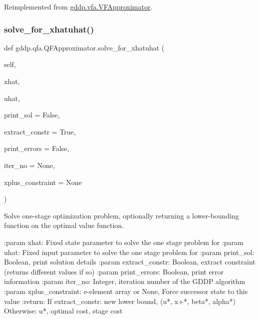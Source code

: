 Reimplemented from \mbox{\hyperlink{classgddp_1_1vfa_1_1_v_f_approximator_af7e7b99c9816b5c809ea1a4b90c67df5}{gddp.\+vfa.\+V\+F\+Approximator}}.

\mbox{\label{classgddp_1_1qfa_1_1_q_f_approximator_aca8822d616ab1114cbf8175a3f764130}} 
\subsubsection{\texorpdfstring{solve\_for\_xhatuhat()}{solve\_for\_xhatuhat()}}
{\footnotesize\ttfamily def gddp.\+qfa.\+Q\+F\+Approximator.\+solve\+\_\+for\+\_\+xhatuhat (\begin{DoxyParamCaption}\item[{}]{self,  }\item[{}]{xhat,  }\item[{}]{uhat,  }\item[{}]{print\+\_\+sol = {\ttfamily False},  }\item[{}]{extract\+\_\+constr = {\ttfamily True},  }\item[{}]{print\+\_\+errors = {\ttfamily False},  }\item[{}]{iter\+\_\+no = {\ttfamily None},  }\item[{}]{xplus\+\_\+constraint = {\ttfamily None} }\end{DoxyParamCaption})}

\begin{DoxyVerb}Solve one-stage optimization problem, optionally returning a lower-bounding function
on the optimal value function.

:param xhat: Fixed state parameter to solve the one stage problem for
:param uhat: Fixed input parameter to solve the one stage problem for
:param print_sol: Boolean, print solution details
:param extract_constr: Boolean, extract constraint (returns different values if so)
:param print_errors: Boolean, print error information
:param iter_no: Integer, iteration number of the GDDP algorithm
:param xplus_constraint: e-element array or None, Force successor state to this value
:return: If extract_constr: new lower bound, (u*, x+*, beta*, alpha*)
 Otherwise: u*, optimal cost, stage cost
\end{DoxyVerb}
 \mbox{\label{classgddp_1_1qfa_1_1_q_f_approximator_a0f3a71348c0348b950b834b8e8f4f4d0}} 
